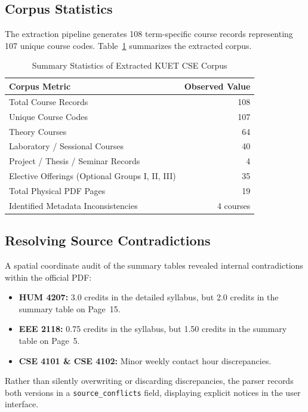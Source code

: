 \documentclass[12pt,a4paper]{report}
\begin{document}
\subsection{Corpus Statistics}
The extraction pipeline generates 108 term-specific course records representing 107 unique course codes. Table~\ref{tab:corpus_stats} summarizes the extracted corpus.

\begin{table}[H]
    \centering
    \caption{Summary Statistics of Extracted KUET CSE Corpus}
    \label{tab:corpus_stats}
    \begin{tabularx}{0.85\textwidth}{Xr}
        \toprule
        \textbf{Corpus Metric} & \textbf{Observed Value} \\
        \midrule
        Total Course Records & 108 \\
        Unique Course Codes & 107 \\
        Theory Courses & 64 \\
        Laboratory / Sessional Courses & 40 \\
        Project / Thesis / Seminar Records & 4 \\
        Elective Offerings (Optional Groups I, II, III) & 35 \\
        Total Physical PDF Pages & 19 \\
        Identified Metadata Inconsistencies & 4 courses \\
        \bottomrule
    \end{tabularx}
\end{table}

\subsection{Resolving Source Contradictions}
A spatial coordinate audit of the summary tables revealed internal contradictions within the official PDF:
\begin{itemize}
    \item \textbf{HUM 4207:} 3.0 credits in the detailed syllabus, but 2.0 credits in the summary table on Page~15.
    \item \textbf{EEE 2118:} 0.75 credits in the syllabus, but 1.50 credits in the summary table on Page~5.
    \item \textbf{CSE 4101 \& CSE 4102:} Minor weekly contact hour discrepancies.
\end{itemize}
Rather than silently overwriting or discarding discrepancies, the parser records both versions in a \texttt{source\_conflicts} field, displaying explicit notices in the user interface.
\end{document}
